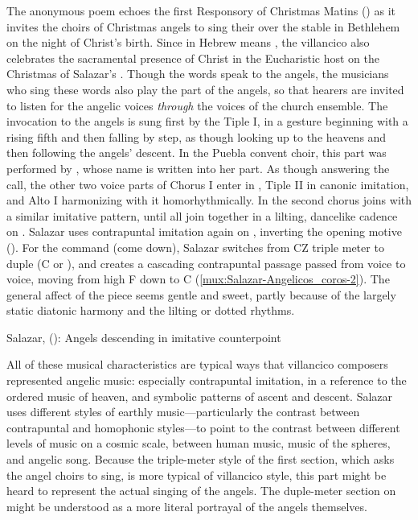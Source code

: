 The anonymous poem echoes the first Responsory of Christmas Matins
() as it invites the choirs of Christmas
angels to sing their  over the stable in Bethlehem on the night
of Christ's birth.
Since  in Hebrew means , the
villancico also celebrates the sacramental presence of Christ in the
Eucharistic host on the Christmas of Salazar's .
Though the words speak to the angels, the musicians who sing these words also
play the part of the angels, so that hearers are invited to listen for the
angelic voices \emph{through} the voices of the church ensemble. 
The invocation to the angels is sung first by the Tiple I, in a gesture
beginning with a rising fifth and then falling by step, as though looking up to
the heavens and then following the angels' descent.
In the Puebla convent choir, this part was performed by ,
whose name is written into her part.
As though answering the call, the other two voice parts of Chorus I enter in
, Tiple II in canonic imitation, and Alto I harmonizing with it
homorhythmically. 
In  the second chorus joins with a similar imitative
pattern, until all join together in a lilting, dancelike cadence on
.
Salazar uses contrapuntal imitation again on ,
inverting the opening motive ().
For the command  (come down), Salazar switches from CZ
triple meter to duple (C or ), and creates a cascading
contrapuntal passage passed from voice to voice, moving from high F
down to C (\cref{mux:Salazar-Angelicos_coros-2}).
The general affect of the piece seems gentle and sweet, partly because of the
largely static diatonic harmony and the lilting or dotted rhythms.


{Salazar,  ():
Angels descending in imitative counterpoint}

All of these musical characteristics are typical ways that villancico composers
represented angelic music: especially contrapuntal imitation, in a reference to
the ordered music of heaven, and symbolic patterns of ascent and descent.
Salazar uses different styles of earthly music---particularly the contrast
between contrapuntal and homophonic styles---to point to the contrast between
different levels of music on a cosmic scale, between human music, music of the
spheres, and angelic song.
Because the triple-meter style of the first section, which asks the angel
choirs to sing, is more typical of villancico style, this part might be heard
to represent the actual singing of the angels.
The duple-meter section on  might be understood as a more literal
portrayal of the angels themselves.

